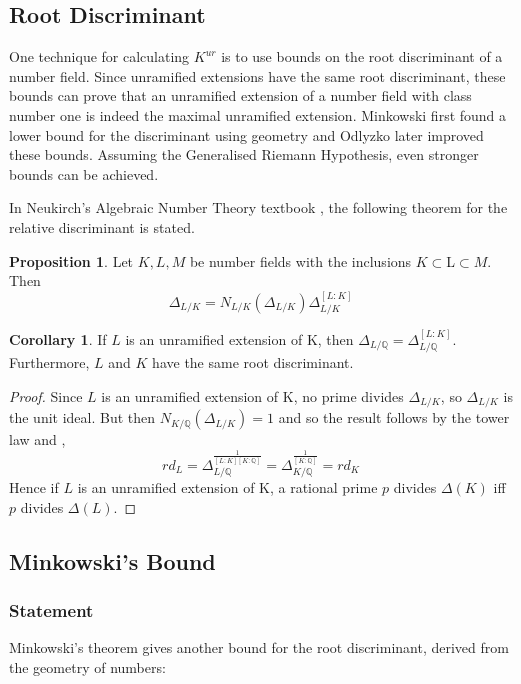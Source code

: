 \documentclass[12pt]{extarticle}
\newcommand{\Q}{\mathbb{Q}}
\newcommand{\<}{\langle}
\renewcommand{\>}{\rangle}
\theoremstyle{definition}
\newtheorem{corollary}{Corollary}
\newtheorem{proposition}{Proposition}
\begin{document}
\subsection{Root Discriminant}
One technique for calculating $K^{ur}$ is to use bounds on the root discriminant of a number field. Since unramified extensions have the same root discriminant, these bounds can prove that an unramified extension of a number field with class number one is indeed the maximal unramified extension. Minkowski first found a lower bound for the discriminant using geometry and Odlyzko later improved these bounds. Assuming the Generalised Riemann Hypothesis, even stronger bounds can be achieved. \par
In Neukirch's Algebraic Number Theory textbook \cite{NEUK}, the following theorem for the relative discriminant is stated. 
\begin{proposition}
Let $K,L,M$ be number fields with the inclusions $ K \subset $L$ \subset M 
$. Then \begin{equation}
    \Delta_{L/K} = N_{L/K}(\Delta_{L/K})\Delta_{L/K}^{[L:K]}
\end{equation} \label{prop:rd}
\end{proposition}
\begin{corollary}
 If $L$ is an unramified extension of K, then $\Delta_{L/\Q}= \Delta_{L/\Q}^{[L:K]}$. Furthermore, $L$ and $K$ have the same root discriminant.
\end{corollary}
\begin{proof}
Since $L$ is an unramified extension of K, no prime divides $\Delta_{L/K}$, so $\Delta_{L/K}$ is the unit ideal. But then $N_{K/\Q}(\Delta_{L/K})=1$ and so the result follows by the tower law and , \begin{equation}
    rd_L=\Delta_{L/\Q}^\frac{1}{[L:K][K:\Q]}=\Delta_{K/\Q}^\frac{1}{[K:\Q]}= rd_K
\end{equation}
Hence if $L$ is an unramified extension of K, a rational prime $p$ divides $\Delta(K)$ iff $p$ divides $\Delta(L)$.
\end{proof}
\subsection{Minkowski's Bound}
\subsubsection*{Statement}
Minkowski's theorem gives another bound for the root discriminant, derived from the geometry of numbers:
\end{document}
